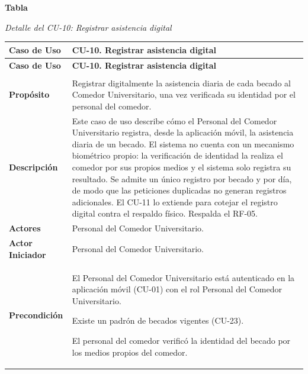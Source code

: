 \label{tab:detalle_cu10}
\noindent\textbf{Tabla~\thetable}\par\nopagebreak
\noindent\textit{Detalle del CU-10: Registrar asistencia digital}\par\nopagebreak
\begingroup\small\linespread{1}\selectfont
\begin{longtable}{>{\raggedright\arraybackslash}p{2.9cm} >{\raggedright\arraybackslash}p{12.6cm}}
\toprule
\textbf{Caso de Uso} & \textbf{CU-10. Registrar asistencia digital} \\
\midrule
\endfirsthead
\toprule
\textbf{Caso de Uso} & \textbf{CU-10. Registrar asistencia digital} \\
\midrule
\endhead
\endfoot
\bottomrule
\multicolumn{2}{l}{\textit{Nota.} Elaboración propia.} \\
\endlastfoot
\textbf{Propósito} & Registrar digitalmente la asistencia diaria de cada becado al Comedor Universitario, una vez verificada su identidad por el personal del comedor. \\
\midrule
\textbf{Descripción} & Este caso de uso describe cómo el Personal del Comedor Universitario registra, desde la aplicación móvil, la asistencia diaria de un becado. El sistema no cuenta con un mecanismo biométrico propio: la verificación de identidad la realiza el comedor por sus propios medios y el sistema solo registra su resultado. Se admite un único registro por becado y por día, de modo que las peticiones duplicadas no generan registros adicionales. El CU-11 lo extiende para cotejar el registro digital contra el respaldo físico. Respalda el RF-05. \\
\midrule
\textbf{Actores} & Personal del Comedor Universitario. \\
\midrule
\textbf{Actor Iniciador} & Personal del Comedor Universitario. \\
\midrule
\textbf{Precondición} & \vspace{-\baselineskip}\begin{cuvin}
    \item El Personal del Comedor Universitario está autenticado en la aplicación móvil (CU-01) con el rol Personal del Comedor Universitario.
    \item Existe un padrón de becados vigentes (CU-23).
    \item El personal del comedor verificó la identidad del becado por los medios propios del comedor.
\end{cuvin} \\

\end{longtable}
